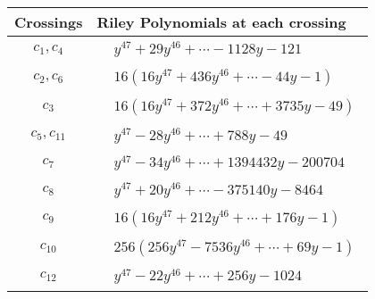 \documentclass[1p]{elsarticle_modified}
\theoremstyle{definition}
\begin{document}
\begin{tabular}{m{50pt}|m{274pt}}
Crossings & \hspace{64pt}Riley Polynomials at each crossing \\
\hline $$\begin{aligned}c_{1},c_{4}\end{aligned}$$&$\begin{aligned}
&y^{47}+29 y^{46}+\cdots-1128 y-121
\end{aligned}$\\
\hline $$\begin{aligned}c_{2},c_{6}\end{aligned}$$&$\begin{aligned}
&16(16 y^{47}+436 y^{46}+\cdots-44 y-1)
\end{aligned}$\\
\hline $$\begin{aligned}c_{3}\end{aligned}$$&$\begin{aligned}
&16(16 y^{47}+372 y^{46}+\cdots+3735 y-49)
\end{aligned}$\\
\hline $$\begin{aligned}c_{5},c_{11}\end{aligned}$$&$\begin{aligned}
&y^{47}-28 y^{46}+\cdots+788 y-49
\end{aligned}$\\
\hline $$\begin{aligned}c_{7}\end{aligned}$$&$\begin{aligned}
&y^{47}-34 y^{46}+\cdots+1394432 y-200704
\end{aligned}$\\
\hline $$\begin{aligned}c_{8}\end{aligned}$$&$\begin{aligned}
&y^{47}+20 y^{46}+\cdots-375140 y-8464
\end{aligned}$\\
\hline $$\begin{aligned}c_{9}\end{aligned}$$&$\begin{aligned}
&16(16 y^{47}+212 y^{46}+\cdots+176 y-1)
\end{aligned}$\\
\hline $$\begin{aligned}c_{10}\end{aligned}$$&$\begin{aligned}
&256(256 y^{47}-7536 y^{46}+\cdots+69 y-1)
\end{aligned}$\\
\hline $$\begin{aligned}c_{12}\end{aligned}$$&$\begin{aligned}
&y^{47}-22 y^{46}+\cdots+256 y-1024
\end{aligned}$\\
\hline
\end{tabular}\\~\\
\end{document}
